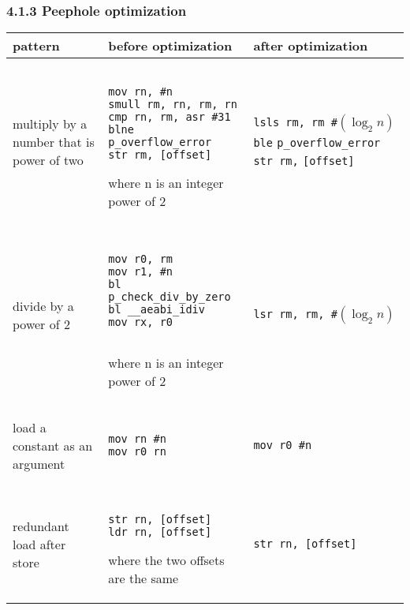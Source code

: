 \documentclass[10pt,a4paper]{report}
\newenvironment{tabularverbatim}
 {\VerbatimEnvironment
  \begin{BVerbatim}[baseline=c,formatcom=\setlength{\baselineskip}{\normalbaselineskip}]}
 {\end{BVerbatim}}
\begin{document}
  \subsubsection*{4.1.3 Peephole optimization}
  \begin{center}
    \begin{tabular}{| m{3cm} | m{4cm} | m{4cm} |}
      \hline
      pattern & before optimization & after optimization \\
      \hline
      multiply by a number that is power of two &
      \begin{tabularverbatim}

mov rn, #n
smull rm, rn, rm, rn
cmp rn, rm, asr #31
blne p_overflow_error
str rm, [offset]

      \end{tabularverbatim}
      \newline
      where n is an integer power of 2
      &
      \texttt{lsls rm, rm \#$(\log_2 n)$}
      \newline
      \texttt{ble} \verb|p_overflow_error|
      \newline
      \texttt{str rm,} \verb|[offset]|
      \\
      \hline
      divide by a power of 2 &
      \begin{tabularverbatim}

mov r0, rm
mov r1, #n
bl p_check_div_by_zero
bl __aeabi_idiv
mov rx, r0
 
      \end{tabularverbatim}
      \newline
      where n is an integer power of 2
      &
      \texttt{lsr rm, rm, \#$(\log_2 n)$}
      \\
      \hline
      load a constant as an argument &
      \begin{tabularverbatim}

mov rn #n
mov r0 rn
 
      \end{tabularverbatim}
      &
      \begin{tabularverbatim}
mov r0 #n

      \end{tabularverbatim}
      \\
      \hline
      redundant load after store &
      \begin{tabularverbatim}

str rn, [offset]
ldr rn, [offset]

      \end{tabularverbatim}
      \newline
      where the two offsets are the same
      &
      \begin{tabularverbatim}
str rn, [offset]
      \end{tabularverbatim}
      \\
      \hline
    \end{tabular}
  \end{center}
\end{document}
